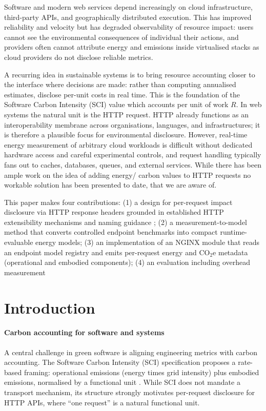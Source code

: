 Software and modern web services depend increasingly on cloud infrastructure, third-party APIs, and geographically distributed execution. This has improved reliability and velocity but has degraded observability of resource impact: users cannot see the environmental consequences of individual their actions, and providers often cannot attribute energy and emissions inside virtualised stacks as cloud providers do not disclose reliable metrics.

A recurring idea in sustainable systems is to bring resource accounting closer to the interface where decisions are made: rather than computing annualised estimates, disclose per-unit costs in real time. This is the foundation of the Software Carbon Intensity (SCI) value which accounts per unit of work $R$\cite{gsf-sci}.  In web systems the natural unit is the HTTP request. HTTP already functions as an interoperability membrane across organisations, languages, and infrastructures; it is therefore a plausible focus for environmental disclosure. However, real-time energy measurement of arbitrary cloud workloads is difficult without dedicated hardware access and careful experimental controls, and request handling typically fans out to caches, databases, queues, and external services. While there has been ample work on the idea of adding energy/ carbon values to HTTP requests\cite{martin-http-carbon-emissions-scope-2-00,httpwg-admin-issue-52-carbon-emissions,ietf-http-wg-mailinglist-carbon-header-thread} no workable solution has been presented to date, that we are aware of.

This paper makes four contributions:
(1) a design for per-request impact disclosure via HTTP response headers grounded in established HTTP extensibility mechanisms \cite{rfc9110,rfc8941} and naming guidance \cite{rfc6648};
(2) a measurement-to-model method that converts controlled endpoint benchmarks into compact runtime-evaluable energy models;
(3) an implementation of an NGINX module that reads an endpoint model registry and emits per-request energy and \(\mathrm{CO_2e}\) metadata (operational and embodied components);
(4) an evaluation including overhead measurement


\section{Introduction}



\paragraph{Carbon accounting for software and systems}
A central challenge in green software is aligning engineering metrics with carbon accounting. The Software Carbon Intensity (SCI) specification proposes a rate-based framing: operational emissions (energy times grid intensity) plus embodied emissions, normalised by a functional unit \cite{gsf-sci}. While SCI does not mandate a transport mechanism, its structure strongly motivates per-request disclosure for HTTP APIs, where ``one request'' is a natural functional unit.

